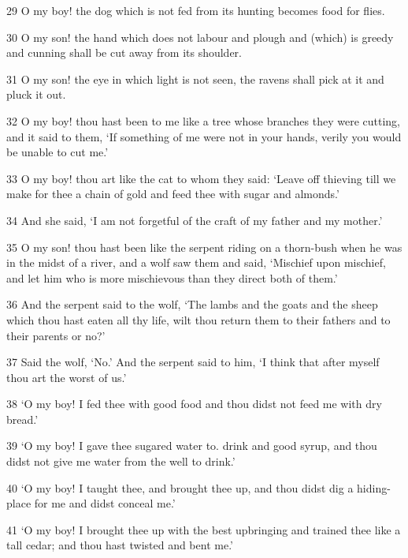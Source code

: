 \par 29 O my boy! the dog which is not fed from its hunting becomes food for flies.

\par 30 O my son! the hand which does not labour and plough and (which) is greedy and cunning shall be cut away from its shoulder.

\par 31 O my son! the eye in which light is not seen, the ravens shall pick at it and pluck it out.

\par 32 O my boy! thou hast been to me like a tree whose branches they were cutting, and it said to them, ‘If something of me were not in your hands, verily you would be unable to cut me.’

\par 33 O my boy! thou art like the cat to whom they said: ‘Leave off thieving till we make for thee a chain of gold and feed thee with sugar and almonds.’

\par 34 And she said, ‘I am not forgetful of the craft of my father and my mother.’

\par 35 O my son! thou hast been like the serpent riding on a thorn-bush when he was in the midst of a river, and a wolf saw them and said, ‘Mischief upon mischief, and let him who is more mischievous than they direct both of them.’

\par 36 And the serpent said to the wolf, ‘The lambs and the goats and the sheep which thou hast eaten all thy life, wilt thou return them to their fathers and to their parents or no?’

\par 37 Said the wolf, ‘No.’ And the serpent said to him, ‘I think that after myself thou art the worst of us.’

\par 38 ‘O my boy! I fed thee with good food and thou didst not feed me with dry bread.’

\par 39 ‘O my boy! I gave thee sugared water to. drink and good syrup, and thou didst not give me water from the well to drink.’

\par 40 ‘O my boy! I taught thee, and brought thee up, and thou didst dig a hiding-place for me and didst conceal me.’

\par 41 ‘O my boy! I brought thee up with the best upbringing and trained thee like a tall cedar; and thou hast twisted and bent me.’

